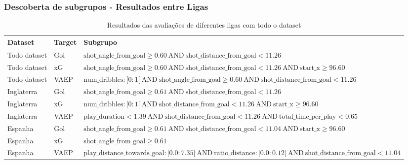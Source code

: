 \documentclass{beamer}
\begin{document}
\begin{frame}
\frametitle{Descoberta de subgrupos - Resultados entre Ligas}
\begin{table}[H]
    \centering
    \begin{tabularx}{\textwidth}{|l|l|X|}
        \hline
        \textbf{Dataset} & \textbf{Target} & \textbf{Subgrupo} \\
        \hline
        Todo dataset & Gol & $ \text{shot\_angle\_from\_goal} \geq 0.60 \ \text{AND} \ \text{shot\_distance\_from\_goal} < 11.26 $ \\
        \hline
        Todo dataset & xG & $ \text{shot\_angle\_from\_goal} \geq 0.60 \ \text{AND} \ \text{shot\_distance\_from\_goal} < 11.26 \ \text{AND} \ \text{start\_x} \geq 96.60 $ \\
        \hline
        Todo dataset & VAEP & $ \text{num\_dribbles} : [0:1[ \ \text{AND} \ \text{shot\_angle\_from\_goal} \geq 0.60 \ \text{AND} \ \text{shot\_distance\_from\_goal} < 11.26 $ \\
        \hline
        Inglaterra & Gol & $ \text{shot\_angle\_from\_goal} \geq 0.61 \ \text{AND} \ \text{shot\_distance\_from\_goal} < 11.26 $ \\
        \hline
        Inglaterra & xG & $ \text{num\_dribbles} : [0:1[ \ \text{AND} \ \text{shot\_distance\_from\_goal} < 11.26 \ \text{AND} \ \text{start\_x} \geq 96.60 $ \\
        \hline
        Inglaterra & VAEP & $ \text{play\_duration} < 1.39 \ \text{AND} \ \text{shot\_distance\_from\_goal} < 11.26 \ \text{AND} \ \text{total\_time\_per\_play} < 0.65 $ \\
        \hline
        Espanha & Gol & $ \text{shot\_angle\_from\_goal} \geq 0.61 \ \text{AND} \ \text{shot\_distance\_from\_goal} < 11.04 \ \text{AND} \ \text{start\_x} \geq 96.60 $ \\
        \hline
        Espanha & xG & $ \text{shot\_angle\_from\_goal} \geq 0.61 $ \\
        \hline
        Espanha & VAEP & $ \text{play\_distance\_towards\_goal} : [0.0:7.35[ \ \text{AND} \ \text{ratio\_distance} : [0.0:0.12[ \ \text{AND} \ \text{shot\_distance\_from\_goal} < 11.04 $ \\
        \hline
    \end{tabularx}
    \caption{Resultados das avaliações de diferentes ligas com todo o dataset}
    \label{tab:resultsSD}
\end{table}
\end{frame}
\end{document}
